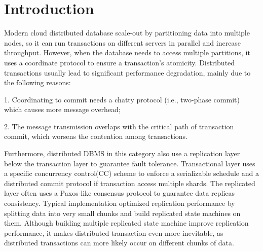 \documentclass[conference]{IEEEtran}
\begin{document}
\section{Introduction}

Modern cloud distributed database scale-out by partitioning data into multiple nodes, so it can run transactions on different servers in parallel and increase throughput.
However, when the database needs to access multiple partitions, it uses a coordinate protocol to ensure a transaction's atomicity.
Distributed transactions usually lead to significant performance degradation, mainly due to the following reasons\cite{Calvin:conf/sigmod/ThomsonDWRSA12}:

1. Coordinating to commit needs a chatty protocol (i.e., two-phase commit) which causes more message overhead;

2. The message transmission overlaps with the critical path of transaction commit, which worsens the contention among transactions.

Furthermore, distributed DBMS in this category also use a replication layer below the transaction layer to guarantee fault tolerance.
Transactional layer uses a specific concurrency control(CC) scheme to enforce a serializable schedule and a distributed commit protocol if transaction access multiple shards.
The replicated layer often uses a Paxos-like consensus protocol to guarantee data replicas consistency.
Typical implementation optimized replication performance by splitting data into very small chunks and build replicated state machines on them.
Although building multiple replicated state machine improve replication performance, it makes distributed transaction even more inevitable,
as distributed transactions can more likely occur on different chunks of data.
\end{document}
